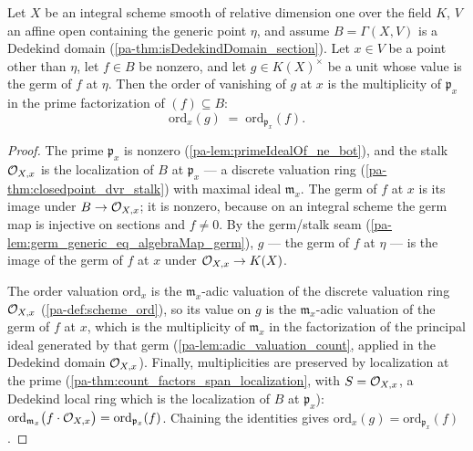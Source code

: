 \begin{theorem}
  \label{pa-thm:toAdd_ordZ_eq_count_factors}
  \leanok

  Let \(X\) be an integral scheme smooth of relative dimension one over the field
  \(K\), \(V\) an affine open containing the generic point \(\eta\), and assume
  \(B = \Gamma(X, V)\) is a Dedekind domain (\ref{pa-thm:isDedekindDomain_section}). Let
  \(x \in V\) be a point other than \(\eta\), let \(f \in B\) be nonzero, and let
  \(g \in K(X)^\times\) be a unit whose value is the germ of \(f\) at \(\eta\). Then
  the order of vanishing of \(g\) at \(x\) is the multiplicity of \(\mathfrak p_x\) in
  the prime factorization of \((f) \subseteq B\):
  \[
    \mathrm{ord}_x(g) \;=\; \mathrm{ord}_{\mathfrak p_x}(f) .
  \]
\end{theorem}
\begin{proof}
  \leanok
  The prime \(\mathfrak p_x\) is nonzero (\ref{pa-lem:primeIdealOf_ne_bot}), and the
  stalk \(\mathcal{O}_{X,x}\) is the localization of \(B\) at \(\mathfrak p_x\) --- a
  discrete valuation ring (\ref{pa-thm:closedpoint_dvr_stalk}) with maximal ideal
  \(\mathfrak m_x\). The germ of \(f\) at \(x\) is its image under
  \(B \to \mathcal{O}_{X,x}\); it is nonzero, because on an integral scheme the germ map is
  injective on sections and \(f \neq 0\). By the germ/stalk seam
  (\ref{pa-lem:germ_generic_eq_algebraMap_germ}), \(g\) --- the germ of \(f\) at
  \(\eta\) --- is the image of the germ of \(f\) at \(x\) under
  \(\mathcal{O}_{X,x} \to K(X)\).

  The order valuation \(\mathrm{ord}_x\) is the \(\mathfrak m_x\)-adic valuation of
  the discrete valuation ring \(\mathcal{O}_{X,x}\) (\ref{pa-def:scheme_ord}), so its value on
  \(g\) is the \(\mathfrak m_x\)-adic valuation of the germ of \(f\) at \(x\), which
  is the multiplicity of \(\mathfrak m_x\) in the factorization of the principal
  ideal generated by that germ (\ref{pa-lem:adic_valuation_count}, applied in the
  Dedekind domain \(\mathcal{O}_{X,x}\)). Finally, multiplicities are preserved by
  localization at the prime (\ref{pa-thm:count_factors_span_localization}, with
  \(S = \mathcal{O}_{X,x}\), a Dedekind local ring which is the localization of \(B\) at
  \(\mathfrak p_x\)):
  \(\mathrm{ord}_{\mathfrak m_x}\bigl(f \cdot \mathcal{O}_{X,x}\bigr)
  = \mathrm{ord}_{\mathfrak p_x}(f)\). Chaining the identities gives
  \(\mathrm{ord}_x(g) = \mathrm{ord}_{\mathfrak p_x}(f)\).
\end{proof}

